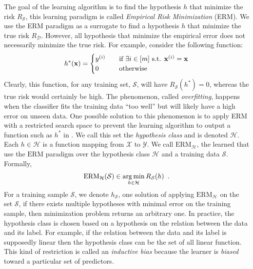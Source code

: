 The goal of the learning algorithm is to find the hypothesis $h$ that minimize the risk $R_{\mathcal{S}}$, this learning paradigm is called \emph{Empirical Risk Minimization} (ERM).
We use the ERM paradigm as a surrogate to find a hypothesis $h$ that minimize the true risk $R_\mathcal{D}$.
However, all hypothesis that minimize the empirical error does not necessarily minimize the true risk.
For example, consider the following function:
\begin{equation}
  h^*(\mathbf{x}) =
  \begin{cases}
    y^{(i)} &\quad \text{if }\exists i \in [m] \text{ s.t. } \mathbf{x}^{(i)} = \mathbf{x} \\
    0 &\quad \text{otherwise}
  \end{cases}
  \label{equation:ch2-perfect_function}
\end{equation}
Clearly, this function, for any training set, $\mathcal{S}$, will have $R_\mathcal{S}(h^*) = 0$, whereas the true risk would certainly be high.
The phenomenon, called \emph{overfitting}, happens when the classifier fits the training data ``too well'' but will likely have a high error on unseen data.
One possible solution to this phenomenon is to apply ERM with a restricted search space to prevent the learning algorithm to output a function such as $h^*$ in .
We call this set the \emph{hypothesis class} and is denoted $\mathcal{H}$. 
Each $h \in \mathcal{H}$ is a function mapping from $\mathcal{X}$ to $\mathcal{Y}$.
We call $\mathrm{ERM}_{\mathcal{H}}$, the learned that use the $\mathrm{ERM}$ paradigm over the hypothesis class $\mathcal{H}$ and a training data $\mathcal{S}$.
Formally,
\begin{equation}
  \mathrm{ERM}_{\mathcal{H}}(\mathcal{S}) \in \operatorname*{arg\,min}_{h \in \mathcal{H}} R_{\mathcal{S}}(h) \enspace.
\end{equation}
For a training sample $\mathcal{S}$, we denote $h_\mathcal{S}$, one solution of applying $\text{ERM}_\mathcal{H}$ on the set $\mathcal{S}$, if there exists multiple hypotheses with minimal error on the training sample, then minimization problem returns an arbitrary one.
In practice, the hypothesis class is chosen based on a hypothesis on the relation between the data and its label.
For example, if the relation between the data and its label is supposedly linear then the hypothesis class can be the set of all linear function.
This kind of restriction is called an \emph{inductive bias} because the learner is \emph{biased} toward a particular set of predictors.


